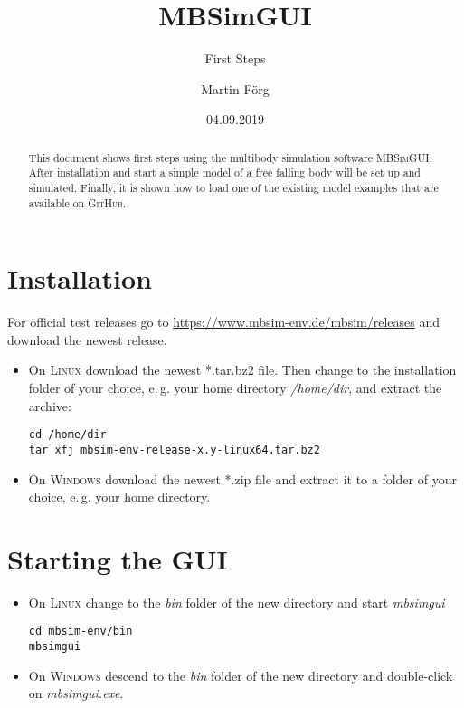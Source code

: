 \documentclass[
a4paper,
fleqn,
DIV=15,
pagesize
]{scrartcl}
\begin{document}
\subject{MBSim -- Environment}
\title{MBSimGUI}
\subtitle{First Steps}
\author{Martin Förg}
\date{04.09.2019}

\maketitle

\begin{abstract}
This document shows first steps using the multibody simulation software
\textsc{MBSimGUI}. After installation and start a
simple model of a free falling body will be set up and simulated. Finally, it is shown how to load one of the existing model examples that are available on \textsc{GitHub}.
\end{abstract}


\tableofcontents


\section{Installation}
For official test releases go to \url{https://www.mbsim-env.de/mbsim/releases}
and download the newest release.
\begin{itemize}
\item On \textsc{Linux}
download the newest *.tar.bz2 file.
Then change to the installation folder of your choice, e.\,g. your home directory
\emph{/home/dir}, and extract the archive:
\begin{verbatim}
cd /home/dir
tar xfj mbsim-env-release-x.y-linux64.tar.bz2
\end{verbatim}

\item On \textsc{Windows}
download the newest *.zip file
and extract it to a folder of your choice, e.\,g. your home directory.
\end{itemize}

\section{Starting the GUI}

\begin{itemize}
\item On \textsc{Linux} change to the \emph{bin} folder of the new directory and start
\emph{mbsimgui}
\begin{verbatim}
cd mbsim-env/bin
mbsimgui
\end{verbatim}

\item On \textsc{Windows}
descend to the \emph{bin} folder of the new directory and double-click on
\emph{mbsimgui.exe}.
\end{itemize}
\end{document}
